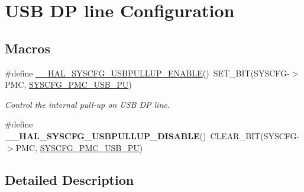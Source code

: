 \hypertarget{group___s_y_s_c_f_g___u_s_b_config}{\section{U\-S\-B D\-P line Configuration}
\label{group___s_y_s_c_f_g___u_s_b_config}
}
\subsection*{Macros}
\begin{DoxyCompactItemize}
\item 
\hypertarget{group___s_y_s_c_f_g___u_s_b_config_ga7faf3c6611dfc84b6356619d992bdb7e}{\#define \hyperlink{group___s_y_s_c_f_g___u_s_b_config_ga7faf3c6611dfc84b6356619d992bdb7e}{\-\_\-\-\_\-\-H\-A\-L\-\_\-\-S\-Y\-S\-C\-F\-G\-\_\-\-U\-S\-B\-P\-U\-L\-L\-U\-P\-\_\-\-E\-N\-A\-B\-L\-E}()~S\-E\-T\-\_\-\-B\-I\-T(S\-Y\-S\-C\-F\-G-\/$>$P\-M\-C, \hyperlink{group___peripheral___registers___bits___definition_gaeacd458ca5466228f2f21c66253a9f5e}{S\-Y\-S\-C\-F\-G\-\_\-\-P\-M\-C\-\_\-\-U\-S\-B\-\_\-\-P\-U})}\label{group___s_y_s_c_f_g___u_s_b_config_ga7faf3c6611dfc84b6356619d992bdb7e}

\begin{DoxyCompactList}\small\item\em Control the internal pull-\/up on U\-S\-B D\-P line. \end{DoxyCompactList}\item 
\hypertarget{group___s_y_s_c_f_g___u_s_b_config_gaee2096666e85cef164572e443433d6f5}{\#define {\bfseries \-\_\-\-\_\-\-H\-A\-L\-\_\-\-S\-Y\-S\-C\-F\-G\-\_\-\-U\-S\-B\-P\-U\-L\-L\-U\-P\-\_\-\-D\-I\-S\-A\-B\-L\-E}()~C\-L\-E\-A\-R\-\_\-\-B\-I\-T(S\-Y\-S\-C\-F\-G-\/$>$P\-M\-C, \hyperlink{group___peripheral___registers___bits___definition_gaeacd458ca5466228f2f21c66253a9f5e}{S\-Y\-S\-C\-F\-G\-\_\-\-P\-M\-C\-\_\-\-U\-S\-B\-\_\-\-P\-U})}\label{group___s_y_s_c_f_g___u_s_b_config_gaee2096666e85cef164572e443433d6f5}

\end{DoxyCompactItemize}


\subsection{Detailed Description}
